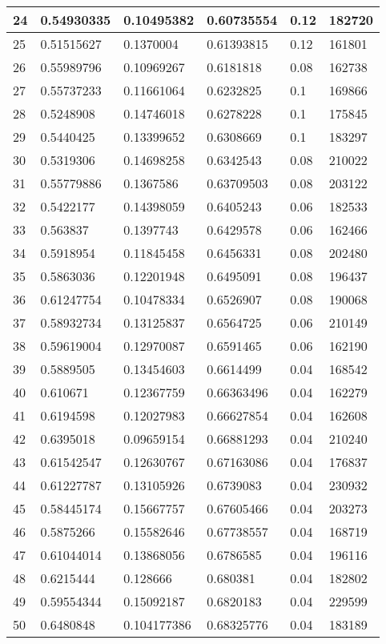 \begin{longtable}{|l|l|l|l|l|l|}
24 & 0.54930335 & 0.10495382 & 0.60735554 & 0.12 & 182720 \\ \hline 
25 & 0.51515627 & 0.1370004 & 0.61393815 & 0.12 & 161801 \\ \hline 
26 & 0.55989796 & 0.10969267 & 0.6181818 & 0.08 & 162738 \\ \hline 
27 & 0.55737233 & 0.11661064 & 0.6232825 & 0.1 & 169866 \\ \hline 
28 & 0.5248908 & 0.14746018 & 0.6278228 & 0.1 & 175845 \\ \hline 
29 & 0.5440425 & 0.13399652 & 0.6308669 & 0.1 & 183297 \\ \hline 
30 & 0.5319306 & 0.14698258 & 0.6342543 & 0.08 & 210022 \\ \hline 
31 & 0.55779886 & 0.1367586 & 0.63709503 & 0.08 & 203122 \\ \hline 
32 & 0.5422177 & 0.14398059 & 0.6405243 & 0.06 & 182533 \\ \hline 
33 & 0.563837 & 0.1397743 & 0.6429578 & 0.06 & 162466 \\ \hline 
34 & 0.5918954 & 0.11845458 & 0.6456331 & 0.08 & 202480 \\ \hline 
35 & 0.5863036 & 0.12201948 & 0.6495091 & 0.08 & 196437 \\ \hline 
36 & 0.61247754 & 0.10478334 & 0.6526907 & 0.08 & 190068 \\ \hline 
37 & 0.58932734 & 0.13125837 & 0.6564725 & 0.06 & 210149 \\ \hline 
38 & 0.59619004 & 0.12970087 & 0.6591465 & 0.06 & 162190 \\ \hline 
39 & 0.5889505 & 0.13454603 & 0.6614499 & 0.04 & 168542 \\ \hline 
40 & 0.610671 & 0.12367759 & 0.66363496 & 0.04 & 162279 \\ \hline 
41 & 0.6194598 & 0.12027983 & 0.66627854 & 0.04 & 162608 \\ \hline 
42 & 0.6395018 & 0.09659154 & 0.66881293 & 0.04 & 210240 \\ \hline 
43 & 0.61542547 & 0.12630767 & 0.67163086 & 0.04 & 176837 \\ \hline 
44 & 0.61227787 & 0.13105926 & 0.6739083 & 0.04 & 230932 \\ \hline 
45 & 0.58445174 & 0.15667757 & 0.67605466 & 0.04 & 203273 \\ \hline 
46 & 0.5875266 & 0.15582646 & 0.67738557 & 0.04 & 168719 \\ \hline 
47 & 0.61044014 & 0.13868056 & 0.6786585 & 0.04 & 196116 \\ \hline 
48 & 0.6215444 & 0.128666 & 0.680381 & 0.04 & 182802 \\ \hline 
49 & 0.59554344 & 0.15092187 & 0.6820183 & 0.04 & 229599 \\ \hline 
50 & 0.6480848 & 0.104177386 & 0.68325776 & 0.04 & 183189 \\ \hline 
\end{longtable}
